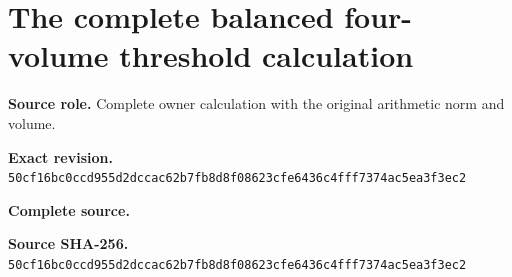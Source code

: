 \begingroup
\sloppy
\small
\section{The complete balanced four-volume threshold calculation}
\noindent\textbf{Source role.} Complete owner calculation with the original arithmetic norm and volume.\par
\noindent\textbf{Exact revision.} \nolinkurl{50cf16bc0ccd955d2dccac62b7fb8d8f08623cfe6436c4fff7374ac5ea3f3ec2}\par
\noindent\textbf{Complete source.} \par
\noindent\textbf{Source SHA-256.} \nolinkurl{50cf16bc0ccd955d2dccac62b7fb8d8f08623cfe6436c4fff7374ac5ea3f3ec2}\par\medskip

\endgroup
